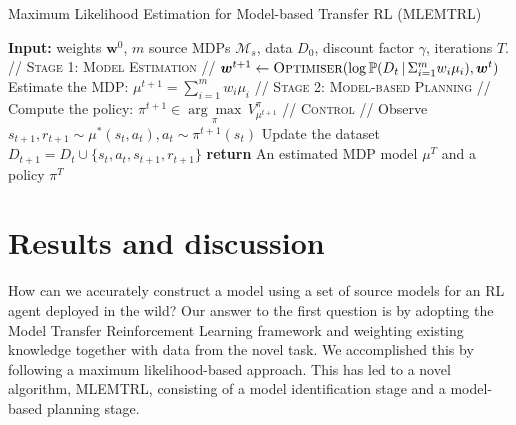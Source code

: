 \begin{algorithm}[t!]
  \caption{Maximum Likelihood Estimation for Model-based Transfer RL (MLEMTRL)}\label{alg:thesis_mlemtrl}
  \begin{algorithmic}[1]
  \State \textbf{Input:} weights $\bm{w}^0$, $m$ source MDPs $\mathcal{M}_s$, data $D_0$, discount factor $\gamma$, iterations $T$.
  \State\textsc{// Stage 1: Model Estimation //}
  \State $\bm{w}^{t+1}\leftarrow  \textsc{Optimiser}(\log\mathbb{P}(D_t \, | \, \Sigma_{i=1}^m w_i \mu_i), \bm{w}^t)$\label{lin:optimiser}
  \State Estimate the MDP: $\mu^{t+1} = \sum_{i=1}^m w_i \mu_i$
  \State\textsc{// Stage 2: Model-based Planning //}
  \State Compute the policy: $\pi^{t+1} \in \underset{\pi}{\arg\max} \, V_{\mu^{t+1}}^\pi$
  \State\textsc{// Control //}
  \State Observe $s_{t+1}, r_{t+1} \sim \mu^{*}(s_t, a_t), a_t\sim \pi^{t+1}(s_t)$
  \State Update the dataset $D_{t+1} = D_t \cup \{s_t, a_t, s_{t+1}, r_{t+1}\}$
  \EndFor
  \State \textbf{return} An estimated MDP model $\mu^T$ and a policy $\pi^T$
  \end{algorithmic}
\end{algorithm}


\section{Results and discussion}
How can we accurately construct a model using a set of source models for an RL agent deployed in the wild?
Our answer to the first question is by adopting the Model Transfer Reinforcement Learning framework and weighting existing knowledge together with data from the novel task. We accomplished this by following a maximum likelihood-based approach. This has led to a novel algorithm, MLEMTRL, consisting of a model identification stage and a model-based planning stage.

